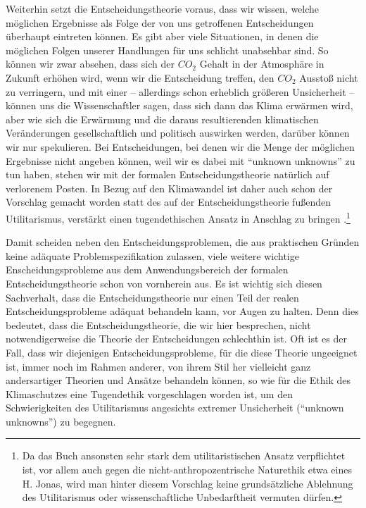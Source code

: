 Weiterhin setzt die Entscheidungstheorie voraus, dass wir wissen,
welche möglichen Ergebnisse als Folge der von uns getroffenen
Entscheidungen überhaupt eintreten können. Es gibt aber viele
Situationen, in denen die möglichen Folgen unserer Handlungen für uns
schlicht unabsehbar sind. So können wir zwar absehen, dass sich der
$CO_2$ Gehalt in der Atmosphäre in Zukunft erhöhen wird, wenn wir die
Entscheidung treffen, den $CO_2$ Ausstoß nicht zu verringern, und mit
einer -- allerdings schon erheblich größeren Unsicherheit -- können
uns die Wissenschaftler sagen, dass sich dann das Klima erwärmen wird,
aber wie sich die Erwärmung und die daraus resultierenden klimatischen
Veränderungen gesellschaftlich und politisch auswirken werden, darüber
können wir nur spekulieren. Bei Entscheidungen, bei denen wir die
Menge der möglichen Ergebnisse nicht angeben können, weil wir es dabei
mit "`unknown unknowns"' zu tun haben, stehen wir mit der formalen
Entscheidungstheorie natürlich auf verlorenem Posten. In Bezug auf den
Klimawandel ist daher auch schon der Vorschlag gemacht worden statt
des auf der Entscheidungstheorie fußenden Utilitarismus, verstärkt
einen tugendethischen Ansatz in Anschlag zu bringen \cite[155ff.,
230ff.]{hillerbrand:2006}.\footnote{Da das Buch ansonsten sehr stark
  dem utilitaristischen Ansatz verpflichtet ist, vor allem auch gegen
  die nicht-anthropozentrische Naturethik etwa eines H. Jonas, wird
  man hinter diesem Vorschlag keine grundsätzliche Ablehnung des
  Utilitarismus oder wissenschaftliche Unbedarftheit vermuten dürfen.}

Damit scheiden neben den Entscheidungsproblemen, die aus praktischen
Gründen keine adäquate Problemspezifikation zulassen, viele weitere
wichtige Enscheidungsprobleme aus dem Anwendungsbereich der formalen
Entscheidungstheorie schon von vornherein aus. Es ist wichtig sich
diesen Sachverhalt, dass die Entscheidungstheorie nur einen Teil der
realen Entscheidungsprobleme adäquat behandeln kann, vor Augen zu
halten. Denn dies bedeutet, dass die Entscheidungstheorie, die wir
hier besprechen, nicht notwendigerweise die Theorie der Entscheidungen
schlechthin ist. Oft ist es der Fall, dass wir diejenigen
Entscheidungsprobleme, für die diese Theorie ungeeignet ist, immer
noch im Rahmen anderer, von ihrem Stil her vielleicht ganz
andersartiger Theorien und Ansätze behandeln können, so wie für die
Ethik des Klimaschutzes eine Tugendethik vorgeschlagen worden ist, um
den Schwierigkeiten des Utilitarismus angesichts extremer Unsicherheit
("`unknown unknowns"') zu begegnen.

